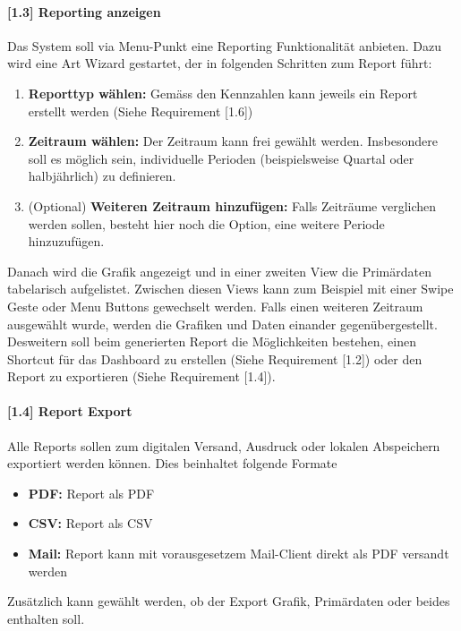 \documentclass[a4paper]{scrreprt}
\begin{document}
\paragraph{[1.3] Reporting anzeigen}
Das System soll via Menu-Punkt eine Reporting Funktionalität anbieten. Dazu wird eine Art Wizard gestartet, der in folgenden Schritten zum Report führt:
\begin{enumerate}
\item \textbf{Reporttyp wählen:} Gemäss den Kennzahlen kann jeweils ein Report erstellt werden (Siehe Requirement [1.6])
\item \textbf{Zeitraum wählen:} Der Zeitraum kann frei gewählt werden. Insbesondere soll es möglich sein, individuelle Perioden (beispielsweise Quartal oder halbjährlich) zu definieren.
\item (Optional) \textbf{Weiteren Zeitraum hinzufügen:} Falls Zeiträume verglichen werden sollen, besteht hier noch die Option, eine weitere Periode hinzuzufügen.
\end{enumerate}
Danach wird die Grafik angezeigt und in einer zweiten View die Primärdaten tabelarisch aufgelistet. Zwischen diesen Views kann zum Beispiel mit einer Swipe Geste oder Menu Buttons gewechselt werden. Falls einen weiteren Zeitraum ausgewählt wurde, werden die Grafiken und Daten einander gegenübergestellt.\\
Desweitern soll beim generierten Report die Möglichkeiten bestehen, einen Shortcut für das Dashboard zu erstellen (Siehe Requirement [1.2]) oder den Report zu exportieren (Siehe Requirement [1.4]).

\pagebreak

\paragraph{[1.4] Report Export}
Alle Reports sollen zum digitalen Versand, Ausdruck oder lokalen Abspeichern exportiert werden können. Dies beinhaltet folgende Formate
\begin{itemize}
\item \textbf{PDF:} Report als PDF
\item \textbf{CSV:} Report als CSV
\item \textbf{Mail:} Report kann mit vorausgesetzem Mail-Client direkt als PDF versandt werden
\end{itemize}
Zusätzlich kann gewählt werden, ob der Export Grafik, Primärdaten oder beides enthalten soll.
\end{document}
